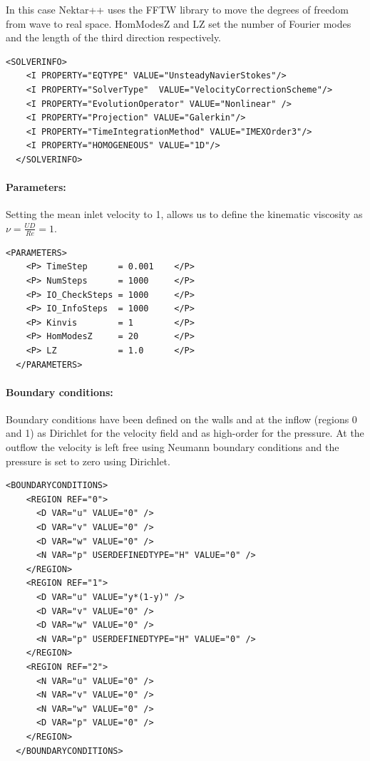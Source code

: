In this case Nektar++ uses the FFTW library to move the degrees of freedom from wave to real space. HomModesZ and LZ set the number of Fourier modes and the length of the third direction respectively.
\begin{lstlisting}[style=XMLStyle]
  <SOLVERINFO>
    <I PROPERTY="EQTYPE" VALUE="UnsteadyNavierStokes"/>
    <I PROPERTY="SolverType"  VALUE="VelocityCorrectionScheme"/>
    <I PROPERTY="EvolutionOperator" VALUE="Nonlinear" />
    <I PROPERTY="Projection" VALUE="Galerkin"/>
    <I PROPERTY="TimeIntegrationMethod" VALUE="IMEXOrder3"/>
    <I PROPERTY="HOMOGENEOUS" VALUE="1D"/>
  </SOLVERINFO>
\end{lstlisting}

\paragraph{Parameters:~} Setting the mean inlet velocity to 1, allows us to define the kinematic viscosity as $\nu = \frac{UD}{Re}=1$.
\begin{lstlisting}[style=XMLStyle]
  <PARAMETERS>
    <P> TimeStep      = 0.001    </P>
    <P> NumSteps      = 1000     </P>
    <P> IO_CheckSteps = 1000     </P>
    <P> IO_InfoSteps  = 1000     </P>
    <P> Kinvis        = 1        </P>
    <P> HomModesZ     = 20       </P>
    <P> LZ            = 1.0      </P>
  </PARAMETERS>
\end{lstlisting}

\paragraph{Boundary conditions:~} Boundary conditions have been defined on the walls and at the inflow (regions 0 and 1) as Dirichlet for the velocity field and as high-order for the pressure. At the outflow the velocity is left free using Neumann boundary conditions and the pressure is set to zero using Dirichlet.
\begin{lstlisting}[style=XMLStyle]
  <BOUNDARYCONDITIONS>
    <REGION REF="0">
      <D VAR="u" VALUE="0" />
      <D VAR="v" VALUE="0" />
      <D VAR="w" VALUE="0" />
      <N VAR="p" USERDEFINEDTYPE="H" VALUE="0" />
    </REGION>
    <REGION REF="1">
      <D VAR="u" VALUE="y*(1-y)" />
      <D VAR="v" VALUE="0" />
      <D VAR="w" VALUE="0" />
      <N VAR="p" USERDEFINEDTYPE="H" VALUE="0" />
    </REGION>
    <REGION REF="2">
      <N VAR="u" VALUE="0" />
      <N VAR="v" VALUE="0" />
      <N VAR="w" VALUE="0" />
      <D VAR="p" VALUE="0" />
    </REGION>
  </BOUNDARYCONDITIONS>
\end{lstlisting}

